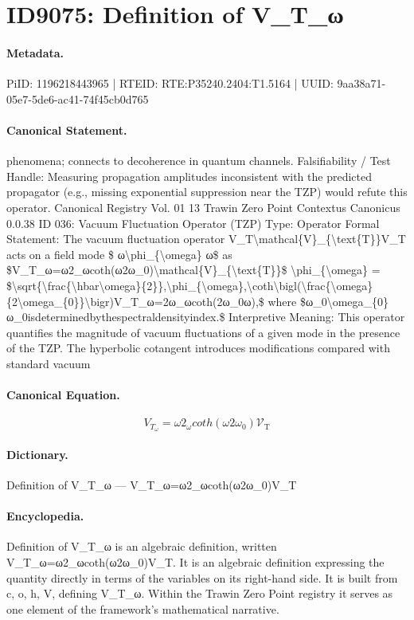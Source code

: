 \section*{ID9075: Definition of V\_T\_ω}
\paragraph{Metadata.}
PiID: 1196218443965 | RTEID: RTE:P35240.2404:T1.5164 | UUID: 9aa38a71-05e7-5de6-ac41-74f45cb0d765

\paragraph{Canonical Statement.}
phenomena; connects to decoherence in quantum channels. Falsifiability / Test Handle: Measuring propagation amplitudes inconsistent with the predicted propagator (e.g., missing exponential suppression near the TZP) would refute this operator. Canonical Registry Vol. 01 13 Trawin Zero Point Contextus Canonicus 0.0.38 ID 036: Vacuum Fluctuation Operator (TZP) Type: Operator Formal Statement: The vacuum fluctuation operator V\_T\textbackslash{}mathcal\{V\}\_\{\textbackslash{}text\{T\}\}V\_T acts on a field mode \$ ω\textbackslash{}phi\_\{\textbackslash{}omega\} ω\$ as \$V\_T\_ω=ω2\_ωcoth(ω2ω\_0)\textbackslash{}mathcal\{V\}\_\{\textbackslash{}text\{T\}\}\$ \textbackslash{}phi\_\{\textbackslash{}omega\} = \$\textbackslash{}sqrt\{\textbackslash{}frac\{\textbackslash{}hbar\textbackslash{}omega\}\{2\}\},\textbackslash{}phi\_\{\textbackslash{}omega\},\textbackslash{}coth\textbackslash{}bigl(\textbackslash{}frac\{\textbackslash{}omega\}\{2\textbackslash{}omega\_\{0\}\}\textbackslash{}bigr)V\_T\_ω=2ω\_ωcoth(2ω\_0ω),\$ where \$ω\_0\textbackslash{}omega\_\{0\}ω\_0isdeterminedbythespectraldensityindex.\$ Interpretive Meaning: This operator quantifies the magnitude of vacuum fluctuations of a given mode in the presence of the TZP. The hyperbolic cotangent introduces modifications compared with standard vacuum

\paragraph{Canonical Equation.}
\[
V_T_ω=ω2_ωcoth(ω2ω_0)\mathcal{V}_{\text{T}}
\]

\paragraph{Dictionary.}
Definition of V\_T\_ω — V\_T\_ω=ω2\_ωcoth(ω2ω\_0)V\_T

\paragraph{Encyclopedia.}
Definition of V\_T\_ω is an algebraic definition, written V\_T\_ω=ω2\_ωcoth(ω2ω\_0)V\_T. It is an algebraic definition expressing the quantity directly in terms of the variables on its right-hand side. It is built from c, o, h, V, defining V\_T\_ω. Within the Trawin Zero Point registry it serves as one element of the framework's mathematical narrative.
